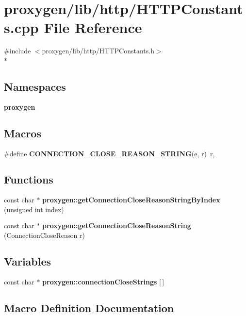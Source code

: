 \section{proxygen/lib/http/\+H\+T\+T\+P\+Constants.cpp File Reference}
\label{HTTPConstants_8cpp}
{\ttfamily \#include $<$proxygen/lib/http/\+H\+T\+T\+P\+Constants.\+h$>$}\\*
\subsection*{Namespaces}
\begin{DoxyCompactItemize}
\item 
 {\bf proxygen}
\end{DoxyCompactItemize}
\subsection*{Macros}
\begin{DoxyCompactItemize}
\item 
\#define {\bf C\+O\+N\+N\+E\+C\+T\+I\+O\+N\+\_\+\+C\+L\+O\+S\+E\+\_\+\+R\+E\+A\+S\+O\+N\+\_\+\+S\+T\+R\+I\+NG}(e,  r)~r,
\end{DoxyCompactItemize}
\subsection*{Functions}
\begin{DoxyCompactItemize}
\item 
const char $\ast$ {\bf proxygen\+::get\+Connection\+Close\+Reason\+String\+By\+Index} (unsigned int index)
\item 
const char $\ast$ {\bf proxygen\+::get\+Connection\+Close\+Reason\+String} (Connection\+Close\+Reason r)
\end{DoxyCompactItemize}
\subsection*{Variables}
\begin{DoxyCompactItemize}
\item 
const char $\ast$ {\bf proxygen\+::connection\+Close\+Strings} [$\,$]
\end{DoxyCompactItemize}


\subsection{Macro Definition Documentation}

